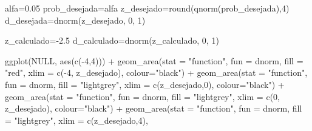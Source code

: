 \documentclass[
]{book}
\newenvironment{Shaded}{\begin{snugshade}}{\end{snugshade}}
\newcommand{\AttributeTok}[1]{\textcolor[rgb]{0.77,0.63,0.00}{#1}}
\newcommand{\ConstantTok}[1]{\textcolor[rgb]{0.00,0.00,0.00}{#1}}
\newcommand{\DecValTok}[1]{\textcolor[rgb]{0.00,0.00,0.81}{#1}}
\newcommand{\FloatTok}[1]{\textcolor[rgb]{0.00,0.00,0.81}{#1}}
\newcommand{\FunctionTok}[1]{\textcolor[rgb]{0.00,0.00,0.00}{#1}}
\newcommand{\NormalTok}[1]{#1}
\newcommand{\OtherTok}[1]{\textcolor[rgb]{0.56,0.35,0.01}{#1}}
\newcommand{\SpecialCharTok}[1]{\textcolor[rgb]{0.00,0.00,0.00}{#1}}
\newcommand{\StringTok}[1]{\textcolor[rgb]{0.31,0.60,0.02}{#1}}
\begin{document}
\begin{Shaded}
\begin{Highlighting}[]
\NormalTok{alfa}\OtherTok{=}\FloatTok{0.05}
\NormalTok{prob\_desejada}\OtherTok{=}\NormalTok{alfa}
\NormalTok{z\_desejado}\OtherTok{=}\FunctionTok{round}\NormalTok{(}\FunctionTok{qnorm}\NormalTok{(prob\_desejada),}\DecValTok{4}\NormalTok{)}
\NormalTok{d\_desejada}\OtherTok{=}\FunctionTok{dnorm}\NormalTok{(z\_desejado, }\DecValTok{0}\NormalTok{, }\DecValTok{1}\NormalTok{)}

\NormalTok{z\_calculado}\OtherTok{=}\SpecialCharTok{{-}}\FloatTok{2.5}
\NormalTok{d\_calculado}\OtherTok{=}\FunctionTok{dnorm}\NormalTok{(z\_calculado, }\DecValTok{0}\NormalTok{, }\DecValTok{1}\NormalTok{)}




\FunctionTok{ggplot}\NormalTok{(}\ConstantTok{NULL}\NormalTok{, }\FunctionTok{aes}\NormalTok{(}\FunctionTok{c}\NormalTok{(}\SpecialCharTok{{-}}\DecValTok{4}\NormalTok{,}\DecValTok{4}\NormalTok{))) }\SpecialCharTok{+}
  \FunctionTok{geom\_area}\NormalTok{(}\AttributeTok{stat =} \StringTok{"function"}\NormalTok{, }
            \AttributeTok{fun =}\NormalTok{ dnorm, }
            \AttributeTok{fill =} \StringTok{"red"}\NormalTok{, }
            \AttributeTok{xlim =} \FunctionTok{c}\NormalTok{(}\SpecialCharTok{{-}}\DecValTok{4}\NormalTok{, z\_desejado),}
            \AttributeTok{colour=}\StringTok{"black"}\NormalTok{) }\SpecialCharTok{+}
  \FunctionTok{geom\_area}\NormalTok{(}\AttributeTok{stat =} \StringTok{"function"}\NormalTok{, }
            \AttributeTok{fun =}\NormalTok{ dnorm, }
            \AttributeTok{fill =} \StringTok{"lightgrey"}\NormalTok{, }
            \AttributeTok{xlim =} \FunctionTok{c}\NormalTok{(z\_desejado,}\DecValTok{0}\NormalTok{),}
            \AttributeTok{colour=}\StringTok{"black"}\NormalTok{) }\SpecialCharTok{+}
  \FunctionTok{geom\_area}\NormalTok{(}\AttributeTok{stat =} \StringTok{"function"}\NormalTok{, }
            \AttributeTok{fun =}\NormalTok{ dnorm, }
            \AttributeTok{fill =} \StringTok{"lightgrey"}\NormalTok{, }
            \AttributeTok{xlim =} \FunctionTok{c}\NormalTok{(}\DecValTok{0}\NormalTok{, z\_desejado),}
            \AttributeTok{colour=}\StringTok{"black"}\NormalTok{) }\SpecialCharTok{+}
  \FunctionTok{geom\_area}\NormalTok{(}\AttributeTok{stat =} \StringTok{"function"}\NormalTok{, }
            \AttributeTok{fun =}\NormalTok{ dnorm, }
            \AttributeTok{fill =} \StringTok{"lightgrey"}\NormalTok{, }
            \AttributeTok{xlim =} \FunctionTok{c}\NormalTok{(z\_desejado,}\DecValTok{4}\NormalTok{),}

\end{Highlighting}
\end{Shaded}
\end{document}
